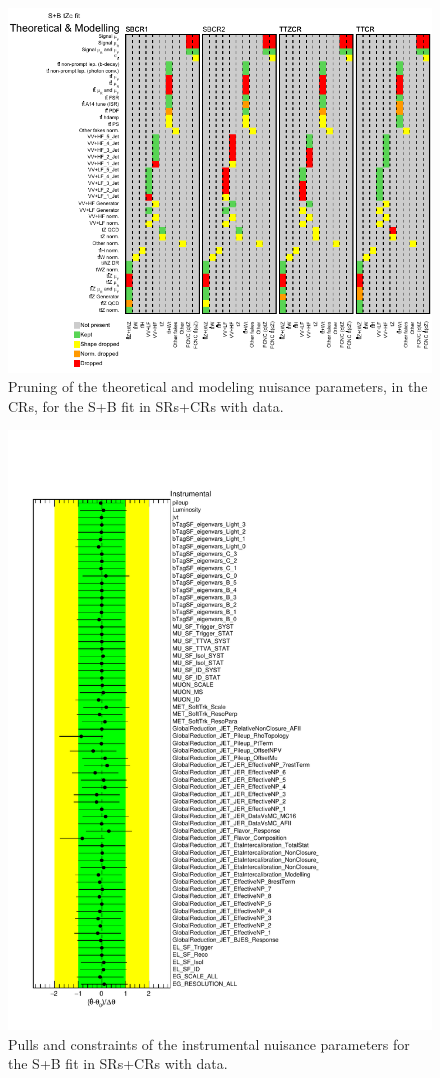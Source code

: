 \begin{figure}[htbp]
	\centering
	\includegraphics[width=.65\textwidth]{Chapters/CH8/figures/SPLUSB_CRSR_DL1rc_unblind/Pruning_split4}
	\caption{Pruning of the theoretical and modeling nuisance parameters, in the CRs, for the S+B \tZc fit in SRs+CRs with data.}%
	\label{fig:stat:tzc:splusb:crsr:pruning_unb4}
\end{figure}



\begin{figure}[htbp]
	\centering
	\includegraphics[width=.8\textwidth]{Chapters/CH8/figures/SPLUSB_CRSR_DL1rc_unblind/NuisPar_Instrumental}
	\caption{Pulls and constraints of the instrumental nuisance parameters for the S+B \tZc fit in SRs+CRs with data.}%
	\label{fig:stat:tzc:splusb:crsr:np:instr_unb}
\end{figure}

